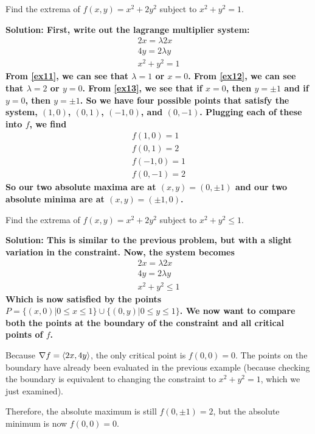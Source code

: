 \begin{example}
    Find the extrema of \(f(x,y)=x^2+2y^2\) subject to \(x^2+y^2=1\).\par\bf{Solution: }First, write out the lagrange multiplier system:
    \begin{align}
        2x = \lambda 2x \label{ex11}\\
        4y = 2\lambda y \label{ex12}\\
        x^2+y^2=1 \label{ex13}
    \end{align}
    From \ref{ex11}, we can see that \(\lambda =1\) or \(x=0\). From \ref{ex12}, we can see that \(\lambda=2\) or \(y=0\). From \ref{ex13}, we see that if \(x=0\), then \(y=\pm 1\) and if \(y=0\), then \(y=\pm 1\). So we have four possible points that satisfy the system, \((1, 0)\), \((0, 1)\), \((-1, 0)\), and \((0, -1)\). Plugging each of these into \(f\), we find
    \begin{align*}
        f(1, 0) = 1 \\
        f(0, 1) = 2 \\
        f(-1, 0) = 1 \\
        f(0, -1) = 2
    \end{align*}
    So our two absolute maxima are at \((x,y) = (0, \pm 1)\) and our two absolute minima are at \((x,y)=(\pm 1, 0)\).
\end{example}
\begin{example}
    Find the extrema of \(f(x,y)=x^2+2y^2\) subject to \(x^2+y^2 \leq 1\).\par\bf{Solution: }This is similar to the previous problem, but with a slight variation in the constraint. Now, the system becomes
    \begin{align}
        2x = \lambda 2x \label{ex21}\\
        4y = 2\lambda y \label{ex22}\\
        x^2+y^2\leq 1 \label{ex23}
    \end{align}
    Which is now satisfied by the points \(P = \{(x, 0)|0\leq x\leq 1\}\cup\{(0, y)|0\leq y\leq 1\}\). We now want to compare both the points at the boundary of the constraint and all critical points of \(f\).\par Because \(\nabla f = \left\langle2x, 4y\right\rangle\), the only critical point is \(f(0, 0) = 0\). The points on the boundary have already been evaluated in the previous example (because checking the boundary is equivalent to changing the constraint to \(x^2+y^2=1\), which we just examined). \par Therefore, the absolute maximum is still \(f(0, \pm 1) = 2\), but the absolute minimum is now \(f(0,0)=0\).
\end{example}
